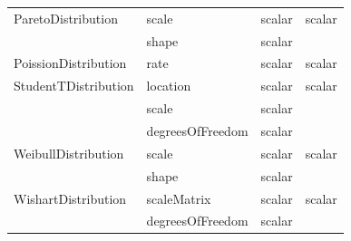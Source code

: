 \documentclass[draftspec]{sbmlpkgspec}
\begin{document}
\begin{longtable}[c]{ l l l l }
ParetoDistribution & scale & scalar & scalar \\
                                & shape & scalar & \\\midrule
PoissionDistribution & rate & scalar & scalar \\\midrule
StudentTDistribution & location & scalar & scalar \\
                                    & scale & scalar & \\
                                    & degreesOfFreedom & scalar &
                                    \\\midrule
WeibullDistribution  & scale & scalar & scalar \\
                                     & shape & scalar & \\\midrule
WishartDistribution & scaleMatrix & scalar & scalar \\
                                  & degreesOfFreedom & scalar & \\
\end{longtable}


\end{document}
